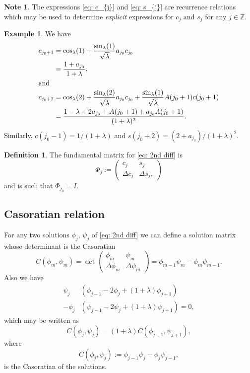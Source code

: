 \documentclass[11pt]{article}
\theoremstyle{definition}
\newtheorem{defn}{Definition}
\newtheorem*{note}{Note}
\newtheorem{exa}{Example}
\begin{document}
\begin{note}
The expressions \eqref{eq: c_{j}} and \eqref{eq: s_{j}} are recurrence relations which may be used to determine \emph{explicit} expressions for $c_{j}$ and $s_{j}$ for any $j\in\mathbb Z$.
\end{note}
\begin{exa}
We have 
\begin{align}
	c_{j_0+1}&=\cos_\lambda(1)+\frac{\sin_\lambda(1)}{\sqrt\lambda}a_{j_0}c_{j_0}\\
	&=\frac{1+a_{j_0}}{1+\lambda},\\
\intertext{and}
	c_{j_0+2}&=\cos_\lambda(2)+\frac{\sin_\lambda(2)}{\sqrt\lambda}a_{j_0}c_{j_0}
	+\frac{\sin_\lambda(1)}{\sqrt\lambda}A(j_0+1)c(j_0+1)\\
	&=\frac{1-\lambda+2a_{j_0}+A(j_0+1)+a_{j_0}A(j_0+1)}{(1+\lambda)^2}.
\end{align}
Similarly, $c(j_0-1)=1/(1+\lambda)$ and $s(j_0+2)=(2+a_{j_0})/(1+\lambda)^2$.
\end{exa}
\begin{defn}
The fundamental matrix for \eqref{eq: 2nd diff} is
\begin{equation}
	\Phi_{j}:=
	\begin{pmatrix}
	c_{j}&s_{j}\\
	\Delta c_{j}&\Delta s_{j},
	\end{pmatrix}
\end{equation}
and is such that $\Phi_{j_0}=I$.
\end{defn}

\subsection{Casoratian relation}
For any two solutions $\phi_{j}$, $\psi_{j}$ of \eqref{eq: 2nd diff} we can define a solution matrix whose determinant is the Casoratian
\begin{equation}
C(\phi_{m},\psi_{m})=\det
\begin{pmatrix}
\phi_{m}&\psi_{m}\\
\Delta\phi_{m}&\Delta\psi_{m}
\end{pmatrix}	
=\phi_{m-1}\psi_{m}-\phi_{m}\psi_{m-1}.
\end{equation}
Also we have
\begin{align}
\psi_{j}&(\phi_{j-1}-2\phi_{j}+(1+\lambda)\phi_{j+1})\\
-\phi_{j}&(\psi_{j-1}-2\psi_{j}+(1+\lambda)\psi_{j+1})=0,
\end{align}
which may be written as
\begin{equation}\label{eq: cas}
C(\phi_{j},\psi_{j})=(1+\lambda)C(\phi_{j+1},\psi_{j+1}),
\end{equation}
where  
\begin{equation}
C(\phi_{j},\psi_{j}):=\phi_{j-1}\psi_{j}-\phi_{j}\psi_{j-1},
\end{equation}
is the Casoratian of the solutions.
\end{document}
